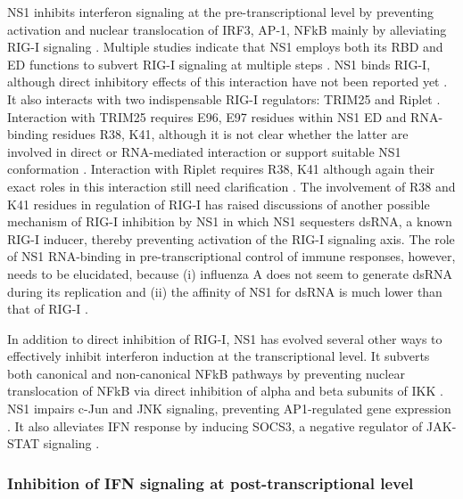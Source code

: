 		
		\gls{NS1} inhibits interferon signaling at the pre-transcriptional level by preventing activation and nuclear translocation of IRF3, AP-1, NFkB mainly by alleviating \gls{RIG-I} signaling \parencite{Talon2000, Ludwig2002, Wang2000, Geiss2002, Munir2012}. Multiple studies indicate that NS1 employs both its \gls{RBD} and \gls{ED} functions to subvert \gls{RIG-I} signaling at multiple steps \parencite{Haye2009, Ludwig2002, Tisoncik2011, Wang2000}. NS1 binds \gls{RIG-I}, although direct inhibitory effects of this interaction have not been reported yet \parencite{Opitz2007, Mibayashi2007a}. It also interacts with two indispensable \gls{RIG-I} regulators: TRIM25 and Riplet \parencite{Gack2009, Rajsbaum2012}. Interaction with TRIM25 requires E96, E97 residues within NS1 ED and RNA-binding residues R38, K41, although it is not clear whether the latter are involved in direct or RNA-mediated interaction or support suitable NS1 conformation \parencite{Gack2009}. Interaction with Riplet requires R38, K41 although again their exact roles in this interaction still need clarification \parencite{Rajsbaum2012}. The involvement of R38 and K41 residues in regulation of RIG-I has raised discussions of another possible mechanism of RIG-I inhibition by NS1 in which NS1 sequesters dsRNA, a known RIG-I inducer, thereby preventing activation of the RIG-I signaling axis. The role of NS1 RNA-binding in pre-transcriptional control   of immune responses, however, needs to be elucidated, because (i) influenza A does not seem to generate dsRNA during its replication \parencite{Wisskirchen2011} and (ii) the affinity of NS1 for dsRNA is much lower than that of RIG-I \parencite{Chien2004, Yin2007, Vela2012}.
		
		In addition to direct inhibition of RIG-I, NS1 has evolved several other ways to  effectively inhibit interferon induction at the transcriptional level. It subverts both canonical and non-canonical \gls{NFkB} pathways \parencite{Ruckle2012a} by preventing nuclear translocation of \gls{NFkB} via direct inhibition of alpha and beta subunits of \gls{IKK} \parencite{Gao2012}. \gls{NS1} impairs c-Jun and JNK signaling, preventing \gls{AP1}-regulated gene expression \parencite{Ludwig2002}. It also alleviates IFN response by inducing \gls{SOCS3}, a negative regulator of \gls{JAK}-STAT signaling \parencite{Pauli2008}. 
		
		\subsubsection{Inhibition of IFN signaling at post-transcriptional level}
		
